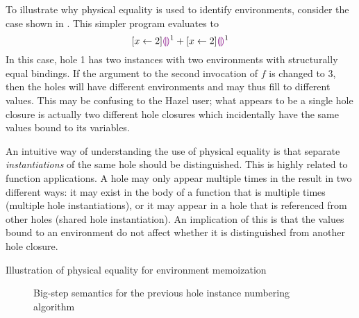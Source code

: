 To illustrate why physical equality is used to identify environments, consider the case shown in . This simpler program evaluates to \[
  [x\leftarrow 2]\textcolor{violet}{\llparenthesis}\textcolor{violet}{\rrparenthesis}^1 + [x\leftarrow 2]\textcolor{violet}{\llparenthesis}\textcolor{violet}{\rrparenthesis}^1
\] In this case, hole 1 has two instances with two environments with structurally equal bindings. If the argument to the second invocation of $f$ is changed to $3$, then the holes will have different environments and may thus fill to different values. This may be confusing to the Hazel user; what appears to be a single hole closure is actually two different hole closures which incidentally have the same values bound to its variables.

An intuitive way of understanding the use of physical equality is that separate \textit{instantiations} of the same hole should be distinguished. This is highly related to function applications. A hole may only appear multiple times in the result in two different ways: it may exist in the body of a function that is multiple times (multiple hole instantiations), or it may appear in a hole that is referenced from other holes (shared hole instantiation). An implication of this is that the values bound to an environment do not affect whether it is distinguished from another hole closure.

\begin{listing}
\caption{Illustration of physical equality for environment memoization}
\label{fig:physical-equality-illustration}
\end{listing}


\begin{singlespace}
  \begin{figure}
    \centering
    \begin{subfigure}{\textwidth}
      \begin{mdframed}[bottomline=false]
        
      \end{mdframed}
    \end{subfigure}
  \end{figure}
  \begin{figure}
    \ContinuedFloat
    \begin{subfigure}{\textwidth}
      \begin{mdframed}[topline=false]
        
      \end{mdframed}
    \end{subfigure}
    \caption{Big-step semantics for the previous hole instance numbering algorithm}
    \label{fig:big-step-renumber-old-rules}
  \end{figure}
\end{singlespace}

